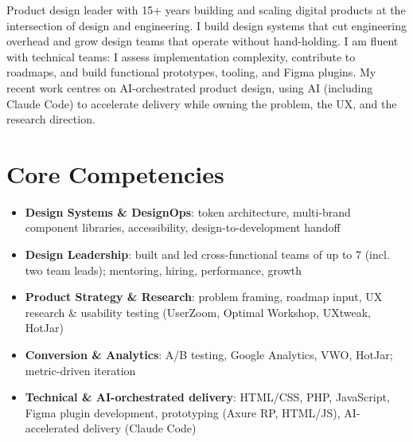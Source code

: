 \documentclass[11pt,a4paper,sans]{moderncv}
\begin{document}
\makecvtitle


\vspace{6pt}
\small{Product design leader with 15+ years building and scaling digital products at the intersection of design and engineering. I build design systems that cut engineering overhead and grow design teams that operate without hand-holding. I am fluent with technical teams: I assess implementation complexity, contribute to roadmaps, and build functional prototypes, tooling, and Figma plugins. My recent work centres on AI-orchestrated product design, using AI (including Claude Code) to accelerate delivery while owning the problem, the UX, and the research direction.}


\section{Core Competencies}
\vspace{1pt}
\begin{itemize}

\item \textbf{Design Systems \& DesignOps}: token architecture, multi-brand component libraries, accessibility, design-to-development handoff

\item \textbf{Design Leadership}: built and led cross-functional teams of up to 7 (incl. two team leads); mentoring, hiring, performance, growth

\item \textbf{Product Strategy \& Research}: problem framing, roadmap input, UX research \& usability testing (UserZoom, Optimal Workshop, UXtweak, HotJar)

\item \textbf{Conversion \& Analytics}: A/B testing, Google Analytics, VWO, HotJar; metric-driven iteration

\item \textbf{Technical \& AI-orchestrated delivery}: HTML/CSS, PHP, JavaScript, Figma plugin development, prototyping (Axure RP, HTML/JS), AI-accelerated delivery (Claude Code)

\end{itemize}
\end{document}
